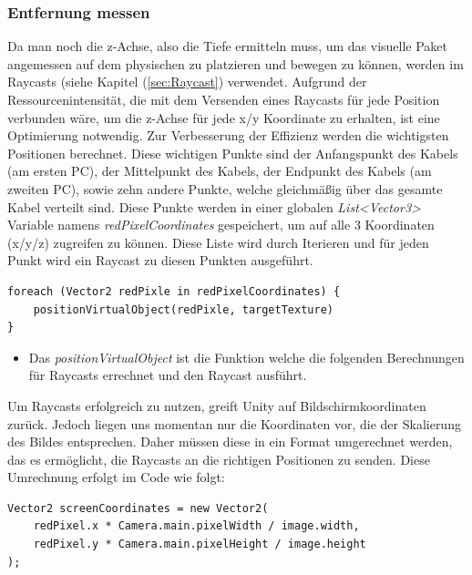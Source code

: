 \subsubsection{\label{sec:EntfernungMessen}Entfernung messen}
Da man noch die z-Achse, also die Tiefe ermitteln muss, um das visuelle Paket angemessen auf dem physischen zu platzieren und bewegen zu können, werden
im Raycasts (siehe Kapitel (\ref{sec:Raycast}) verwendet. Aufgrund der Ressourcenintensität, die mit dem Versenden eines Raycasts
für jede Position verbunden wäre, um die z-Achse für jede x/y Koordinate zu erhalten, ist eine Optimierung notwendig.
Zur Verbesserung der Effizienz werden die wichtigsten Positionen berechnet. Diese wichtigen Punkte sind der
Anfangspunkt des Kabels (am ersten PC), der Mittelpunkt des Kabels, der Endpunkt des Kabels (am zweiten PC), sowie zehn andere Punkte, welche gleichmäßig über das gesamte Kabel verteilt sind. Diese Punkte werden in einer globalen \textit{List<Vector3>} Variable namens \textit{redPixelCoordinates} gespeichert, um auf alle 3 Koordinaten (x/y/z) zugreifen zu können. Diese Liste wird durch Iterieren und für jeden Punkt wird ein Raycast zu diesen Punkten ausgeführt.
\begin{lstlisting}[style=csharp, caption={Iteration durch die Liste der Raycastpunkte}, label=code:]
foreach (Vector2 redPixle in redPixelCoordinates) {
    positionVirtualObject(redPixle, targetTexture)
}
\end{lstlisting}
\begin{itemize}
    \item Das \textit{positionVirtualObject} ist die Funktion welche die folgenden Berechnungen für Raycasts errechnet und den Raycast ausführt. \\
\end{itemize}
Um Raycasts erfolgreich zu nutzen, greift Unity auf Bildschirmkoordinaten zurück. Jedoch liegen uns momentan nur die Koordinaten vor, die der Skalierung des Bildes entsprechen. Daher müssen diese in ein Format umgerechnet werden, das es ermöglicht, die Raycasts an die richtigen Positionen zu senden. Diese Umrechnung erfolgt im Code wie folgt:
\begin{lstlisting}[style=csharp, caption={Koordinaten Umrechnung}, label=code:Coordinates calculations]
Vector2 screenCoordinates = new Vector2(
    redPixel.x * Camera.main.pixelWidth / image.width,
    redPixel.y * Camera.main.pixelHeight / image.height
);
\end{lstlisting}

